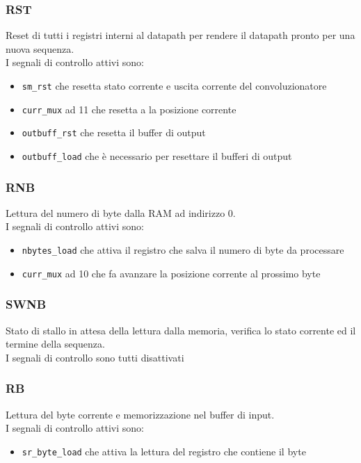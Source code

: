 \documentclass[12pt, a4paper]{article}
\begin{document}
\subsubsection{RST}
Reset di tutti i registri interni al datapath per rendere il datapath pronto per
una nuova sequenza.\\
I segnali di controllo attivi sono:
\begin{itemize}
    \item \texttt{sm\_rst} che resetta stato corrente e uscita corrente del convoluzionatore
    \item \texttt{curr\_mux} ad 11 che resetta a la posizione corrente
    \item \texttt{outbuff\_rst} che resetta il buffer di output
    \item \texttt{outbuff\_load} che è necessario per resettare il bufferi di output
\end{itemize}

\subsubsection{RNB}
Lettura del numero di byte dalla RAM ad indirizzo 0.\\
I segnali di controllo attivi sono:
\begin{itemize}
    \item \texttt{nbytes\_load} che attiva il registro che salva il numero di byte da processare
    \item \texttt{curr\_mux} ad 10 che fa avanzare la posizione corrente al prossimo byte
\end{itemize}

\subsubsection{SWNB}
Stato di stallo in attesa della lettura dalla memoria, verifica lo stato corrente ed il termine della sequenza.\\
I segnali di controllo sono tutti disattivati

\subsubsection{RB}
Lettura del byte corrente e memorizzazione nel buffer di input.\\
I segnali di controllo attivi sono:
\begin{itemize}
    \item \texttt{sr\_byte\_load} che attiva la lettura del registro che contiene il byte
\end{itemize}
\end{document}
